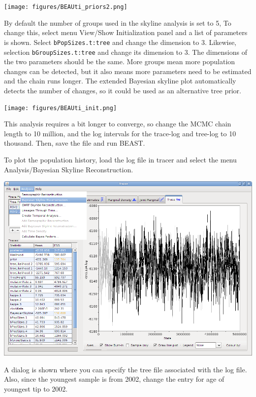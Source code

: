 \documentclass[12pt]{article}
\begin{document}
\begin{center}
\texttt{[image: figures/BEAUti\_priors2.png]}%
\end{center}

By default the number of groups used in the skyline analysis is set to 5, To change this,
select menu View/Show Initialization panel and a list of parameters is shown. Select
{\tt bPopSizes.t:tree} and change the dimension to 3. Likewise, selection {\tt bGroupSizes.t:tree}
and change its dimension to 3. The dimensions of the two parameters should be the same.
More groups mean more population changes can be detected, but it also means more parameters
need to be estimated and the chain runs longer. The extended Bayesian skyline plot
automatically detects the number of changes, so it could be used as an alternative
tree prior.

\begin{center}
\texttt{[image: figures/BEAUti\_init.png]}%
\end{center}


This analysis requires a bit longer to converge, so change the MCMC chain length to 10 million,
and the log intervals for the trace-log and tree-log to 10 thousand. 
Then, save the file and run BEAST.


To plot the population history, load the log file in tracer and select the menu 
Analysis/Bayesian Skyline Reconstruction.

\includegraphics[scale=0.5,clip=true,trim=0 300 0 0]{figures/tracerBSP1.png}

A dialog is shown where you can specify the tree file associated with the log file.
Also, since the youngest sample is from 2002, change the entry for age of youngest
tip to 2002.
\end{document}
